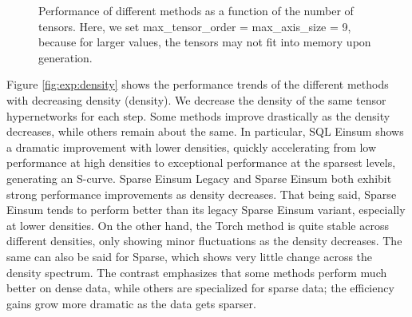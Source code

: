 \begin{figure}[H]
    \caption{Performance of different methods as a function of the number of tensors. Here, we set
        max\_tensor\_order = max\_axis\_size = 9, because for larger values, the tensors may not
        fit into memory upon generation.}
    \label{fig:exp:num_tensors}
\end{figure}

\noindent
Figure \ref{fig:exp:density} shows the performance trends of the different methods with
decreasing density (density). We decrease the density of the same tensor hypernetworks for each step.
Some methods improve drastically as the density decreases, while others remain about the same. In
particular, SQL Einsum shows a dramatic improvement with lower densities, quickly accelerating from low
performance at high densities to exceptional performance at the sparsest levels, generating an
S-curve. Sparse Einsum Legacy and Sparse Einsum both exhibit strong performance improvements as
density decreases. That being said, Sparse Einsum tends to perform better than its legacy Sparse
Einsum variant, especially at lower densities. On the other hand, the Torch method is quite stable
across different densities, only showing minor fluctuations as the density decreases. The same can
also be said for Sparse, which shows very little change across the density spectrum. The contrast
emphasizes that some methods perform much better on dense data, while others are specialized
for sparse data; the efficiency gains grow more dramatic as the data gets sparser.

